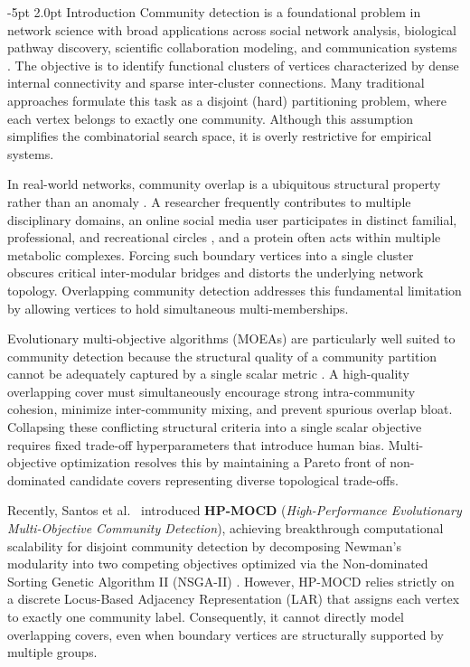\documentclass{svproc}
\makeatletter
\renewcommand\section{\@startsection{section}{1}{\z@}%
  {-5pt \@plus -1pt \@minus -0.5pt}%
  {2.0pt \@plus 0.5pt}%
  {\normalfont\large\bfseries\boldmath}}
\makeatother
\begin{document}
\section{Introduction}\label{sec:intro}
Community detection is a foundational problem in network science with broad applications across social network analysis, biological pathway discovery, scientific collaboration modeling, and communication systems \cite{fortunato2010,newman2006,girvan2002}. The objective is to identify functional clusters of vertices characterized by dense internal connectivity and sparse inter-cluster connections. Many traditional approaches formulate this task as a disjoint (hard) partitioning problem, where each vertex belongs to exactly one community. Although this assumption simplifies the combinatorial search space, it is overly restrictive for empirical systems.

In real-world networks, community overlap is a ubiquitous structural property rather than an anomaly \cite{palla2005,xie2013}. A researcher frequently contributes to multiple disciplinary domains, an online social media user participates in distinct familial, professional, and recreational circles \cite{leskovec2012}, and a protein often acts within multiple metabolic complexes. Forcing such boundary vertices into a single cluster obscures critical inter-modular bridges and distorts the underlying network topology. Overlapping community detection addresses this fundamental limitation by allowing vertices to hold simultaneous multi-memberships.

Evolutionary multi-objective algorithms (MOEAs) are particularly well suited to community detection because the structural quality of a community partition cannot be adequately captured by a single scalar metric \cite{pizzuti2012,deb2002}. A high-quality overlapping cover must simultaneously encourage strong intra-community cohesion, minimize inter-community mixing, and prevent spurious overlap bloat. Collapsing these conflicting structural criteria into a single scalar objective requires fixed trade-off hyperparameters that introduce human bias. Multi-objective optimization resolves this by maintaining a Pareto front of non-dominated candidate covers representing diverse topological trade-offs.

Recently, Santos et al.~\cite{santos2025} introduced \textbf{HP-MOCD} (\textit{High-Performance Evolutionary Multi-Objective Community Detection}), achieving breakthrough computational scalability for disjoint community detection by decomposing Newman's modularity into two competing objectives optimized via the Non-dominated Sorting Genetic Algorithm II (NSGA-II) \cite{deb2002}. However, HP-MOCD relies strictly on a discrete Locus-Based Adjacency Representation (LAR) that assigns each vertex to exactly one community label. Consequently, it cannot directly model overlapping covers, even when boundary vertices are structurally supported by multiple groups.
\end{document}
